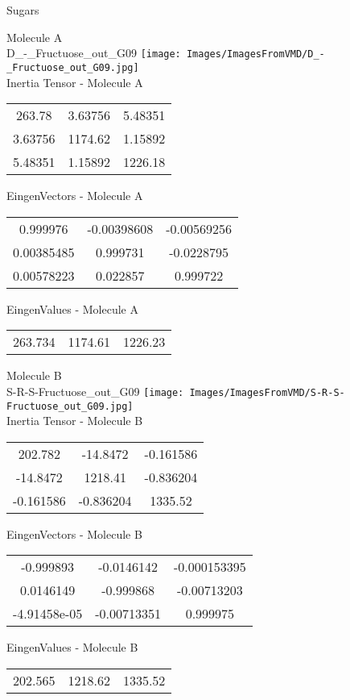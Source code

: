 \vtab[-2cm]
\begin{center}
{\large Sugars}
\end{center}
\begin{multicols}{2}
\begin{center}
Molecule A \\ 
D\_-\_Fructuose\_out\_G09
\texttt{[image: Images/ImagesFromVMD/D\_-\_Fructuose\_out\_G09.jpg]}
\\
Inertia Tensor - Molecule A \\
\vtab
\begin{tabular}{|c c c|}
263.78	 & 	3.63756	 & 	5.48351	 \\
3.63756	 & 	1174.62	 & 	1.15892	 \\
5.48351	 & 	1.15892	 & 	1226.18
\end{tabular}

\vtab
 EingenVectors - Molecule A     \\
\vtab
\begin{tabular}{|c c c|}
0.999976	 & 	-0.00398608	 & 	-0.00569256	 \\
0.00385485	 & 	0.999731	 & 	-0.0228795	 \\
0.00578223	 & 	0.022857	 & 	0.999722
\end{tabular}

\vtab
 EingenValues - Molecule A     \\
\vtab
\begin{tabular}{|c c c|}
263.734	 & 	1174.61	 & 	1226.23
\end{tabular}
\columnbreak

Molecule B \\ 
S-R-S-Fructuose\_out\_G09
\texttt{[image: Images/ImagesFromVMD/S-R-S-Fructuose\_out\_G09.jpg]}
\\
Inertia Tensor - Molecule B \\
\vtab
\begin{tabular}{|c c c|}
202.782	 & 	-14.8472	 & 	-0.161586	 \\
-14.8472	 & 	1218.41	 & 	-0.836204	 \\
-0.161586	 & 	-0.836204	 & 	1335.52
\end{tabular}

\vtab
 EingenVectors - Molecule B     \\
\vtab
\begin{tabular}{|c c c|}
-0.999893	 & 	-0.0146142	 & 	-0.000153395	 \\
0.0146149	 & 	-0.999868	 & 	-0.00713203	 \\
-4.91458e-05	 & 	-0.00713351	 & 	0.999975
\end{tabular}

\vtab
 EingenValues - Molecule B     \\
\vtab
\begin{tabular}{|c c c|}
202.565	 & 	1218.62	 & 	1335.52
\end{tabular}

\end{center}
\end{multicols}
